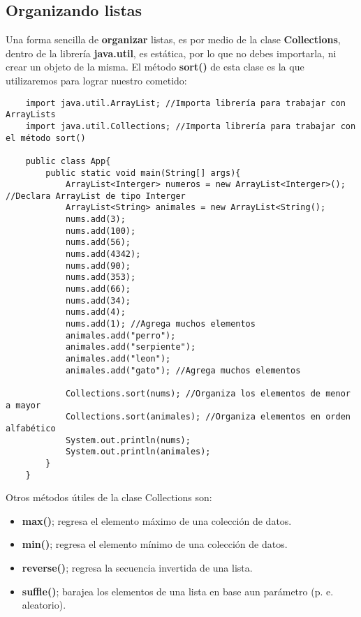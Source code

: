 \subsection{Organizando listas}
\hspace{0.55cm}Una forma sencilla de \textbf{organizar} listas, es por medio de la clase \textbf{Collections}, dentro de la librería \textbf{java.util}, es estática, por lo que no debes importarla, ni crear un objeto de la misma. El método \textbf{sort()} de esta clase es la que utilizaremos para lograr nuestro cometido:
\begin{lstlisting}
    import java.util.ArrayList; //Importa librería para trabajar con ArrayLists
    import java.util.Collections; //Importa librería para trabajar con el método sort()
    
    public class App{
        public static void main(String[] args){
            ArrayList<Interger> numeros = new ArrayList<Interger>(); //Declara ArrayList de tipo Interger
            ArrayList<String> animales = new ArrayList<String();
            nums.add(3);
            nums.add(100);
            nums.add(56);
            nums.add(4342);
            nums.add(90);
            nums.add(353);
            nums.add(66);
            nums.add(34);
            nums.add(4);
            nums.add(1); //Agrega muchos elementos
            animales.add("perro");
            animales.add("serpiente");
            animales.add("leon");
            animales.add("gato"); //Agrega muchos elementos
            
            Collections.sort(nums); //Organiza los elementos de menor a mayor
            Collections.sort(animales); //Organiza elementos en orden alfabético
            System.out.println(nums);
            System.out.println(animales);
        }
    }
\end{lstlisting}

Otros métodos útiles de la clase Collections son:
\begin{itemize}
    \item \textbf{max()}; regresa el elemento máximo de una colección de datos.
    \item \textbf{min()}; regresa el elemento mínimo de una colección de datos.
    \item \textbf{reverse()}; regresa la secuencia invertida de una lista.
    \item \textbf{suffle()}; barajea los elementos de una lista en base aun parámetro (p. e. aleatorio).
\end{itemize}


